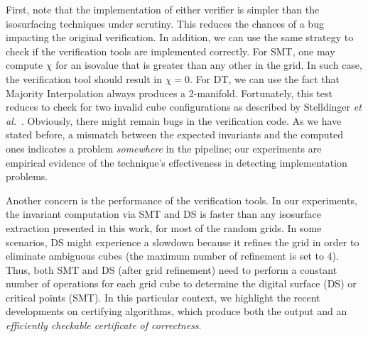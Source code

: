 First, note that the implementation of either verifier is simpler than
the isosurfacing techniques under scrutiny. This reduces the chances
of a bug impacting the original verification.  In addition, we can use
the same strategy to check if the verification tools are implemented
correctly. For SMT, one may compute $\chi$ for an isovalue that is
greater than any other in the grid. In such case, the verification
tool should result in $\chi = 0$. For DT, we can use the fact that
Majority Interpolation always produces a 2-manifold. Fortunately, this
test reduces to check for two invalid cube configurations as described
by Stelldinger \emph{et al.}~\cite{siqueira:2007}. Obviously, there might
remain bugs in the verification code. As we have stated before, a
mismatch between the expected invariants and the computed ones
indicates a problem \emph{somewhere} in the pipeline; our experiments
are empirical evidence of the technique's effectiveness in detecting
implementation problems.

Another concern is the performance of the verification tools. In our
experiments, the invariant computation via SMT and DS is faster than
any isosurface extraction presented in this work, for most of the
random grids. In some scenarios, DS might experience a slowdown
because it refines the grid in order to eliminate ambiguous cubes (the
maximum number of refinement is set to 4). Thus, both SMT and DS (after
grid refinement) need to perform a constant number of operations
for each grid cube to determine the digital surface (DS) or critical
points (SMT).  In this particular context, we highlight the recent
developments on certifying algorithms, which produce both the
output and an \emph{efficiently checkable certificate of
  correctness}\cite{McConnell:2010:CA}.


